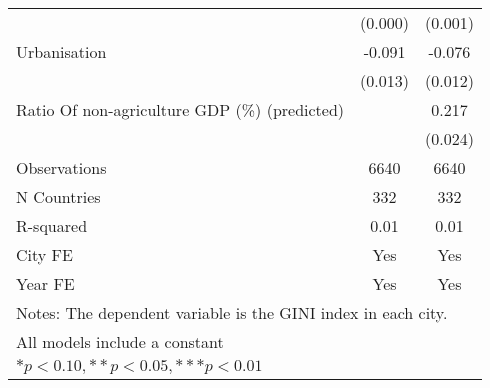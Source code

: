 {\begin{tabular}{l*{2}{c}}
                    &     (0.000)         &     (0.001)         \\
[1em]
Urbanisation        &      -0.091\sym{***}&      -0.076\sym{***}\\
                    &     (0.013)         &     (0.012)         \\
[1em]
Ratio Of non-agriculture GDP (\%) (predicted)&                     &       0.217\sym{***}\\
                    &                     &     (0.024)         \\
\hline
Observations        &        6640         &        6640         \\
N Countries         &         332         &         332         \\
R-squared           &        0.01         &        0.01         \\
City FE             &         Yes         &         Yes         \\
Year FE             &         Yes         &         Yes         \\
\hline\hline
\multicolumn{3}{l}{\footnotesize Notes: The dependent variable is the GINI index in each city.}\\
\multicolumn{3}{l}{\footnotesize All models include a constant}\\
\multicolumn{3}{l}{\footnotesize $* p<0.10, ** p<0.05, *** p<0.01$}\\
\end{tabular}
}

